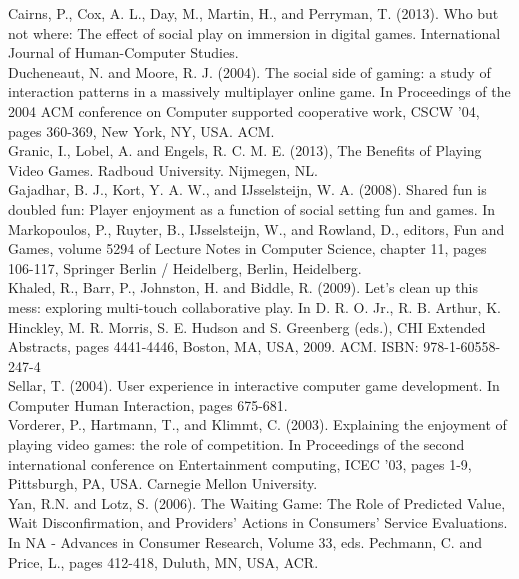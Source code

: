Cairns, P., Cox, A. L., Day, M., Martin, H., and Perryman, T. (2013). Who but not where: The effect of social play on immersion in digital games. International Journal of Human-Computer Studies.
\vspace{0.15cm}\\
Ducheneaut, N. and Moore, R. J. (2004). The social side of gaming: a study of interaction patterns in a massively multiplayer online game. In Proceedings of the 2004 ACM conference on Computer supported cooperative work, CSCW '04, pages 360-369, New York, NY, USA. ACM.
\vspace{0.15cm}\\
Granic, I., Lobel, A. and Engels, R. C. M. E. (2013), The Benefits of Playing Video Games. Radboud University. Nijmegen, NL.
\vspace{0.15cm}\\
Gajadhar, B. J., Kort, Y. A. W., and IJsselsteijn, W. A. (2008). Shared fun is doubled fun: Player enjoyment as a function of social setting fun and games. In Markopoulos, P., Ruyter, B., IJsselsteijn, W., and Rowland, D., editors, Fun and Games, volume 5294 of Lecture Notes in Computer Science, chapter 11, pages 106-117, Springer Berlin / Heidelberg, Berlin, Heidelberg.
\vspace{0.15cm}\\
Khaled, R., Barr, P., Johnston, H. and Biddle, R. (2009). Let's clean up this mess: exploring multi-touch collaborative play. In D. R. O. Jr., R. B. Arthur, K. Hinckley, M. R. Morris, S. E. Hudson and S. Greenberg (eds.), CHI Extended Abstracts, pages 4441-4446, Boston, MA, USA, 2009. ACM. ISBN: 978-1-60558-247-4
\vspace{0.15cm}\\
Sellar, T. (2004). User experience in interactive computer game development. In Computer Human Interaction, pages 675-681.
\vspace{0.15cm}\\
Vorderer, P., Hartmann, T., and Klimmt, C. (2003). Explaining the enjoyment of playing video games: the role of competition. In Proceedings of the second international conference on Entertainment computing, ICEC '03, pages 1-9, Pittsburgh, PA, USA. Carnegie Mellon University.
\vspace{0.15cm}\\
Yan, R.N. and Lotz, S. (2006). The Waiting Game: The Role of Predicted Value, Wait Disconfirmation, and Providers' Actions in Consumers' Service Evaluations. In NA - Advances in Consumer Research, Volume 33, eds. Pechmann, C. and Price, L., pages 412-418, Duluth, MN, USA, ACR.


